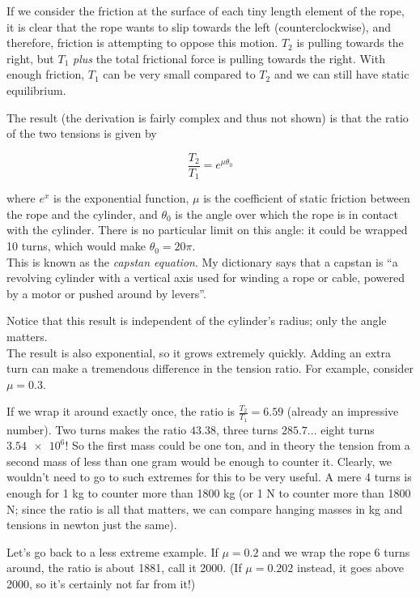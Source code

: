 If we consider the friction at the surface of each tiny length element of the rope, it is clear that the rope wants to slip towards the left (counterclockwise), and therefore, friction is attempting to oppose this motion. $T_2$ is pulling towards the right, but $T_1$ \emph{plus} the total frictional force is pulling towards the right. With enough friction, $T_1$ can be very small compared to $T_2$ and we can still have static equilibrium.

The result (the derivation is fairly complex and thus not shown) is that the ratio of the two tensions is given by

\begin{equation}
\frac{T_2}{T_1} = e^{\mu \theta_0}
\end{equation}

where $e^x$ is the exponential function, $\mu$ is the coefficient of static friction between the rope and the cylinder, and $\theta_0$ is the angle over which the rope is in contact with the cylinder. There is no particular limit on this angle: it could be wrapped 10 turns, which would make $\theta_0 = 20 \pi$.\\
This is known as the \emph{capstan equation}. My dictionary says that a capstan is ``a revolving cylinder with a vertical axis used for winding a rope or cable, powered by a motor or pushed around by levers''.

Notice that this result is independent of the cylinder's radius; only the angle matters.\\
The result is also exponential, so it grows extremely quickly. Adding an extra turn can make a tremendous difference in the tension ratio. For example, consider $\mu = 0.3$.

If we wrap it around exactly once, the ratio is $\displaystyle \frac{T_2}{T_1} = 6.59$ (already an impressive number). Two turns makes the ratio $43.38$, three turns $285.7$... eight turns $\num{3.54e6}$! So the first mass could be one ton, and in theory the tension from a second mass of less than one gram would be enough to counter it. Clearly, we wouldn't need to go to such extremes for this to be very useful. A mere 4 turns is enough for 1 kg to counter more than 1800 kg (or 1 N to counter more than 1800 N; since the ratio is all that matters, we can compare hanging masses in kg and tensions in newton just the same).

Let's go back to a less extreme example. If $\mu = 0.2$ and we wrap the rope 6 turns around, the ratio is about 1881, call it 2000. (If $\mu = 0.202$ instead, it goes above 2000, so it's certainly not far from it!)

